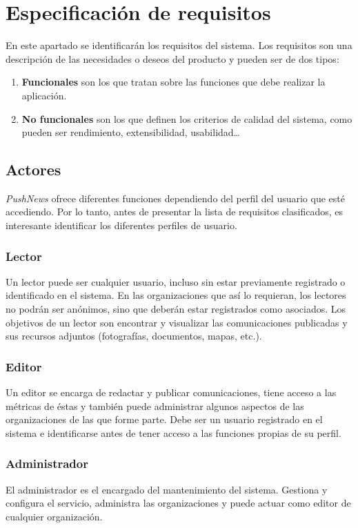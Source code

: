 \chapter{Especificación de requisitos}
En este apartado se identificarán los requisitos del sistema. Los requisitos son una descripción de las necesidades o deseos del producto \cite{Larman2004} y pueden ser de dos tipos:
\begin{enumerate}
    \item \textbf{Funcionales} son los que tratan sobre las funciones que debe realizar la aplicación.
    \item \textbf{No funcionales} son los que definen los criterios de calidad del sistema, como pueden ser rendimiento, extensibilidad, usabilidad\dots
\end{enumerate}

\section {Actores}
\emph{PushNews} ofrece diferentes funciones dependiendo del perfil del usuario que esté accediendo. Por lo tanto, antes de presentar la lista de requisitos clasificados, es interesante identificar los diferentes perfiles de usuario.

\subsection{Lector}
Un lector puede ser cualquier usuario, incluso sin estar previamente registrado o identificado en el sistema. En las organizaciones que así lo requieran, los lectores no podrán ser anónimos, sino que deberán estar registrados como asociados. Los objetivos de un lector son encontrar y visualizar las comunicaciones publicadas y sus recursos adjuntos (fotografías, documentos, mapas, etc.).

\subsection{Editor}
Un editor se encarga de redactar y publicar comunicaciones, tiene acceso a las métricas de éstas y también puede administrar algunos aspectos de las organizaciones de las que forme parte. Debe ser un usuario registrado en el sistema e identificarse antes de tener acceso a las funciones propias de su perfil.

\subsection{Administrador}
El administrador es el encargado del mantenimiento del sistema. Gestiona y configura el servicio, administra las organizaciones y puede actuar como editor de cualquier organización.


